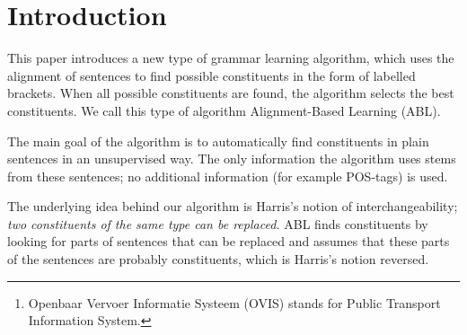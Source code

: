 \documentclass[letterpaper,mlapa]{article}
\begin{document}


\begin{abstract}
This paper introduces a new type of unsupervised learning algorithm, based on
the alignment of sentences and Harris's  notion of
interchangeability. The algorithm is applied to an untagged, unstructured corpus
of natural language sentences, resulting in a labelled, bracketed version of the
corpus. Firstly, the algorithm aligns all sentences in the corpus in pairs,
resulting in a partition of the sentences consisting of parts of the sentences
that are similar in both sentences and parts that are dissimilar. This
information is used to find (possibly overlapping) constituents. Next, the
algorithm selects (non-overlapping) constituents. Several instances of the
algorithm are applied to the ATIS corpus \cite{bib:balacoetpt} and the
OVIS\footnote{Openbaar Vervoer Informatie Systeem (OVIS) stands for Public
Transport Information System.} corpus \cite{bib:admfsi}. Apart from the
promising numerical results, the most striking result is that even the simplest
algorithm based on alignment learns recursion.
\end{abstract}


\section{Introduction}

This paper introduces a new type of grammar learning algorithm, which uses the
alignment of sentences to find possible constituents in the form of labelled
brackets. When all possible constituents are found, the algorithm selects the
best constituents. We call this type of algorithm Alignment-Based Learning
(ABL).

The main goal of the algorithm is to automatically find constituents in plain
sentences in an unsupervised way. The only information the algorithm uses stems
from these sentences; no additional information (for example POS-tags) is used.

The underlying idea behind our algorithm is Harris's notion of
interchangeability; \emph{two constituents of the same type can be replaced.}
ABL finds constituents by looking for parts of sentences that can be
replaced and assumes that these parts of the sentences are probably
constituents, which is Harris's notion reversed.
\end{document}
